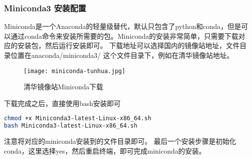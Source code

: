 \documentclass[lang=cn,a4paper,newtx]{elegantpaper}
\begin{document}
\subsubsection{Miniconda3 安装配置}
Miniconda是一个Anaconda的轻量级替代，默认只包含了python和conda，但是可以通过conda命令来安装所需要的包。Miniconda的安装非常简单，只需要下载对应的安装包，然后运行安装即可。
下载地址可以选择国内的镜像站地址，文件目录位置在anaconda/miniconda3/ 这个文件目录下，例如在清华镜像站地址。
\begin{figure}[hbpt]
  \centering
  \texttt{[image: miniconda-tunhua.jpg]}
  \caption{清华镜像站Miniconda下载}
  \label{fig:miniconda-tunhua}
\end{figure}

下载完成之后，直接使用bash安装即可
\begin{lstlisting}[language=bash]
chmod +x Miniconda3-latest-Linux-x86_64.sh
bash Miniconda3-latest-Linux-x86_64.sh
\end{lstlisting}
注意将对应的miniconda安装到的文件目录即可。
最后一个安装步骤是初始化conda，这里选择yes，然后重启终端，即可完成miniconda的安装。
\end{document}
